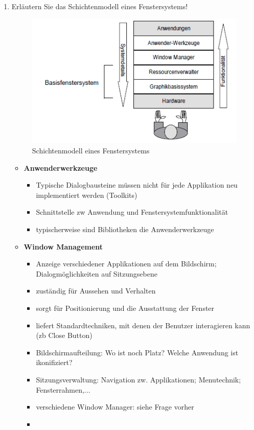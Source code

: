 \begin{enumerate}
	\newpage
	\item Erläutern Sie das Schichtenmodell eines Fenstersystems!
	\begin{figure}[!h]
		\centering
		\includegraphics[scale=0.7]{img/window_layers.png}
		\caption{Schichtenmodell eines Fenstersystems}
	\end{figure}
	\begin{itemize}
		\item \textbf{Anwenderwerkzeuge}
		\begin{itemize}
			\item Typische Dialogbausteine müssen nicht für jede Applikation neu implementiert werden (Toolkits)
			\item Schnittstelle zw Anwendung und Fenstersystemfunktionalität
			\item typischerweise sind Bibliotheken die Anwenderwerkzeuge
		\end{itemize}
		\item \textbf{Window Management}
		\begin{itemize}
			\item Anzeige verschiedener Applikationen auf dem Bildschirm; Dialogmöglichkeiten auf Sitzungsebene
			\item zuständig für Aussehen und Verhalten
			\item sorgt für Positionierung und die Ausstattung der Fenster
			\item liefert Standardtechniken, mit denen der Benutzer interagieren kann (zb Close Button)
			\item Bildschirmaufteilung: Wo ist noch Platz? Welche Anwendung ist ikonifiziert?
			\item Sitzungsverwaltung: Navigation zw. Applikationen; Menutechnik; Fensterrahmen,...
			\item verschiedene Window Manager: siehe Frage vorher
			\item 

\end{itemize}
\end{itemize}
\end{enumerate}
